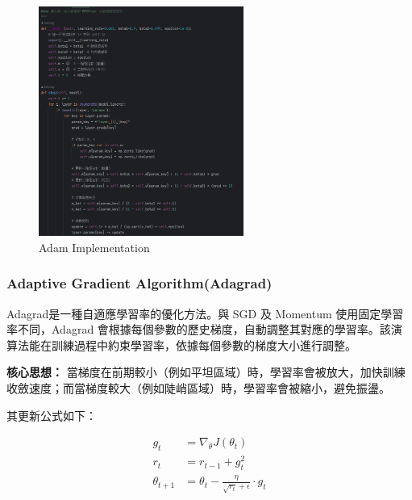 \documentclass{article}
\begin{document}
\begin{figure}[H]
    \centering
    \includegraphics[width=0.6\textwidth]{Lab01_report/img/6.1adam.png}
    \caption{Adam Implementation}
    \label{fig:adam_code}
\end{figure}

\subsubsection{Adaptive Gradient Algorithm(Adagrad)}

Adagrad是一種自適應學習率的優化方法。與 SGD 及 Momentum 使用固定學習率不同，Adagrad 會根據每個參數的歷史梯度，自動調整其對應的學習率。該演算法能在訓練過程中約束學習率，依據每個參數的梯度大小進行調整。

\textbf{核心思想：}
當梯度在前期較小（例如平坦區域）時，學習率會被放大，加快訓練收斂速度；而當梯度較大（例如陡峭區域）時，學習率會被縮小，避免振盪。

其更新公式如下：

\[
\begin{aligned}
g_t &= \nabla_\theta J(\theta_t) \\
r_t &= r_{t-1} + g_t^2 \\
\theta_{t+1} &= \theta_t - \frac{\eta}{\sqrt{r_t} + \epsilon} \cdot g_t
\end{aligned}
\]
\end{document}
